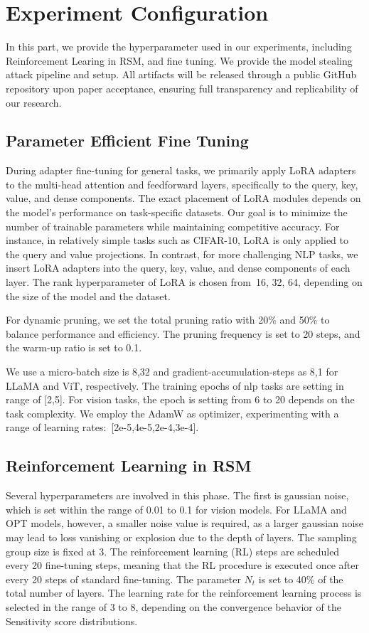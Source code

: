 \section{Experiment Configuration}
In this part, we provide the hyperparameter used in our experiments, including Reinforcement Learing in RSM, and fine tuning. We provide the model stealing attack pipeline and setup. All artifacts will be released through a public GitHub repository upon paper acceptance, ensuring full transparency and replicability of our research.

\label{implementation_parameters}
\subsection{Parameter Efficient Fine Tuning}
During adapter fine-tuning for general tasks, we primarily apply LoRA adapters to the multi-head attention and feedforward layers, specifically to the query, key, value, and dense components. The exact placement of LoRA modules depends on the model's performance on task-specific datasets. Our goal is to minimize the number of trainable parameters while maintaining competitive accuracy. For instance, in relatively simple tasks such as CIFAR-10, LoRA is only applied to the query and value projections. In contrast, for more challenging NLP tasks, we insert LoRA adapters into the query, key, value, and dense components of each layer. The rank hyperparameter of LoRA is chosen from~{16, 32, 64}, depending on the size of the model and the dataset.

For dynamic pruning, we set the total pruning ratio with 20\% and 50\% to balance performance and efficiency. The pruning frequency is set to 20 steps, and the warm-up ratio is set to 0.1. 

We use a micro-batch size is 8,32 and gradient-accumulation-steps as 8,1 for LLaMA and ViT, respectively. The training epochs of nlp tasks are setting in range of [2,5]. For vision tasks, the epoch is setting from 6 to 20 depends on the task complexity. We employ the AdamW as optimizer, experimenting with a range of learning rates:~[2e-5,4e-5,2e-4,3e-4].

\subsection{Reinforcement Learning in RSM}
Several hyperparameters are involved in this phase. The first is gaussian noise, which is set within the range of 0.01 to 0.1 for vision models. For LLaMA and OPT models, however, a smaller noise value is required, as a larger gaussian noise may lead to loss vanishing or explosion due to the depth of layers. The sampling group size is fixed at 3. The reinforcement learning (RL) steps are scheduled every 20 fine-tuning steps, meaning that the RL procedure is executed once after every 20 steps of standard fine-tuning. The parameter $N_t$ is set to 40\% of the total number of layers. The learning rate for the reinforcement learning process is selected in the range of 3 to 8, depending on the convergence behavior of the Sensitivity score distributions.

